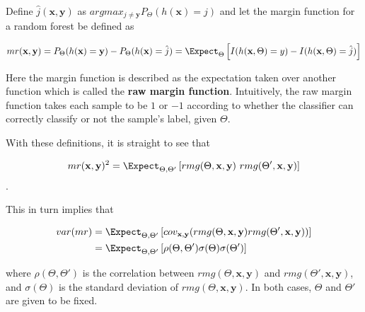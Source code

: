 Define $\hat{j}(\textbf{x},\textbf{y})$ as $arg max_{j\neq \textbf{y}} P_{\Theta}(h(\textbf{x}) = j)$ and let the margin function for a random forest be defined as

\begin{equation}\label{eq:rf-marginFunRf}
mr(\textbf{x},\textbf{y}) =  P_{\Theta}(h(\textbf{x}) = \textbf{y}) - P_{\Theta}(h(\textbf{x}) = \hat{j}) 
\\ 
= \Expect_{\Theta} \left[  I(h(\textbf{x},\Theta ) = y ) - I( h( \textbf{x},\Theta ) = \hat{j} )  \right]
\end{equation} 




Here the margin function is described as the expectation taken over another function which is called the \textbf{raw margin function}\label{eq:rf-rawMarginFun}. Intuitively, the raw margin function takes each sample to be $1$ or $-1$ according to whether the classifier can correctly classify or not the sample's label, given $\Theta$.

With these definitions, it is straight to see that 

$$mr( \textbf{x},\textbf{y} )^2 = \Expect_{\Theta, \Theta'} \left[ rmg( \Theta,\textbf{x},\textbf{y} ) \ rmg(\Theta',\textbf{x},\textbf{y} )  \right] $$.

This in turn implies that

\begin{equation}\label{eq:rf-marginFunVar}
\begin{split}
var(mr) & =  \Expect_{\Theta, \Theta'} 
			\left[ 
				cov_{\textbf{x},\textbf{y}}
				(rmg(\Theta,\textbf{x},\textbf{y} )rmg(\Theta',\textbf{x},\textbf{y} )) 
			\right] \\
& =  \Expect_{\Theta, \Theta'}
			\left[ 
				\rho(\Theta, \Theta')\sigma(\Theta)\sigma(\Theta')
			\right] 
\end{split}
\end{equation}

where $ \rho(\Theta, \Theta')$ is the correlation between $rmg(\Theta,\textbf{x},\textbf{y})$ and $rmg(\Theta',\textbf{x},\textbf{y})$, and $\sigma(\Theta)$ is the standard deviation of $rmg(\Theta,\textbf{x},\textbf{y})$. In both cases, $\Theta$ and $\Theta'$ are given to be fixed. 

